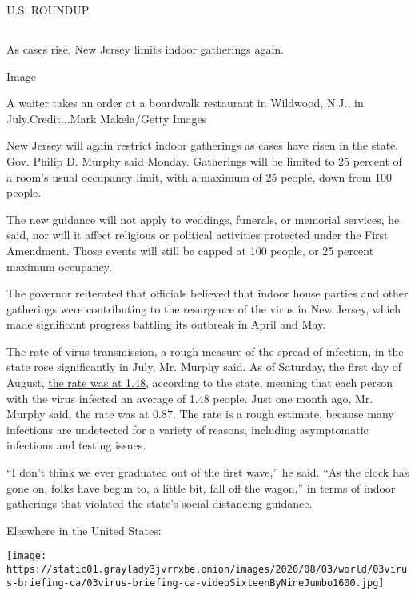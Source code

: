 U.S. ROUNDUP

\hypertarget{-10}{%
\subsection{}\label{-10}}

As cases rise, New Jersey limits indoor gatherings again.

Image

A waiter takes an order at a boardwalk restaurant in Wildwood, N.J., in
July.Credit...Mark Makela/Getty Images

New Jersey will again restrict indoor gatherings as cases have risen in
the state, Gov. Philip D. Murphy said Monday. Gatherings will be limited
to 25 percent of a room's usual occupancy limit, with a maximum of 25
people, down from 100 people.

The new guidance will not apply to weddings, funerals, or memorial
services, he said, nor will it affect religious or political activities
protected under the First Amendment. Those events will still be capped
at 100 people, or 25 percent maximum occupancy.

The governor reiterated that officials believed that indoor house
parties and other gatherings were contributing to the resurgence of the
virus in New Jersey, which made significant progress battling its
outbreak in April and May.

The rate of virus transmission, a rough measure of the spread of
infection, in the state rose significantly in July, Mr. Murphy said. As
of Saturday, the first day of August,
\href{https://twitter.com/GovMurphy/status/1290335172446097409/photo/2}{the
rate was at 1.48}, according to the state, meaning that each person with
the virus infected an average of 1.48 people. Just one month ago, Mr.
Murphy said, the rate was at 0.87. The rate is a rough estimate, because
many infections are undetected for a variety of reasons, including
asymptomatic infections and testing issues.

``I don't think we ever graduated out of the first wave,'' he said. ``As
the clock has gone on, folks have begun to, a little bit, fall off the
wagon,'' in terms of indoor gatherings that violated the state's
social-distancing guidance.

Elsewhere in the United States:

\texttt{[image: https://static01.graylady3jvrrxbe.onion/images/2020/08/03/world/03virus-briefing-ca/03virus-briefing-ca-videoSixteenByNineJumbo1600.jpg]}

